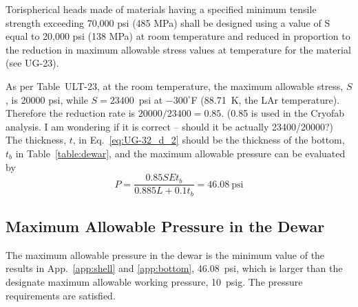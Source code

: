 \begin{displayquote}
    Torispherical heads made of materials having a specified minimum 
    tensile strength exceeding 70,000 psi (485 MPa) shall be designed 
    using a value of S equal to 20,000 psi (138 MPa) at room temperature 
    and reduced in proportion to the reduction in maximum allowable 
    stress values at temperature for the material (see UG-23).
\end{displayquote}

As per Table~ULT-23, at the room temperature, the maximum allowable 
stress, $S$, is 20000 psi, 
while $S = 23400$~psi at $-300^{\circ}$F (88.71~K, the LAr temperature). 
Therefore the reduction rate is $20000/23400 = 0.85$.
(0.85 is used in the Cryofab analysis.
I am wondering if it is correct -- should it be actually 23400/20000?)\\

The thickness, $t$, in Eq.~\ref{eq:UG-32_d_2} should be the thickness
of the bottom, $t_b$ in Table~\ref{table:dewar}, and the maximum allowable
pressure can be evaluated by
\begin{equation}
    P = \frac{0.85SEt_b}{0.885L+0.1t_b} = 46.08~\text{psi}
\end{equation}

\subsection{Maximum Allowable Pressure in the Dewar}
\label{app:mawp}

The maximum allowable pressure in the dewar is the minimum value of
the results in App.~\ref{app:shell} and \ref{app:bottom}, 46.08~psi,
which is larger than the designate maximum allowable working pressure,
10~psig.
The pressure requirements are satisfied.